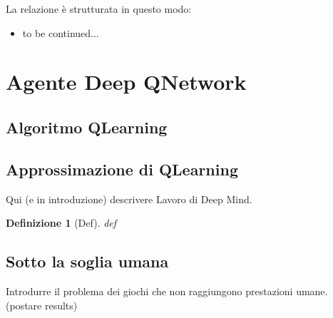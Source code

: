 \documentclass[twoside,twocolumn,10pt]{extarticle}
\theoremstyle{definition}
\begin{document}
	La relazione è strutturata in questo modo:
	\begin{itemize}
		\item to be continued...
	\end{itemize}
	
\section{Agente Deep Q\texttwelveudash Network}\label{sec:dqn-agent}
	\subsection{Algoritmo Q\texttwelveudash Learning}
	
	\subsection{Approssimazione di Q\texttwelveudash Learning}

	Qui (e in introduzione) descrivere Lavoro di Deep Mind.
	\theoremstyle{plain}
	\newtheorem{definition}{Definizione}
	\begin{definition}[Def]\label{def:}
		def
	\end{definition}

	\subsection{Sotto la soglia umana}
		Introdurre il problema dei giochi che non raggiungono prestazioni umane. (postare results)
\end{document}
